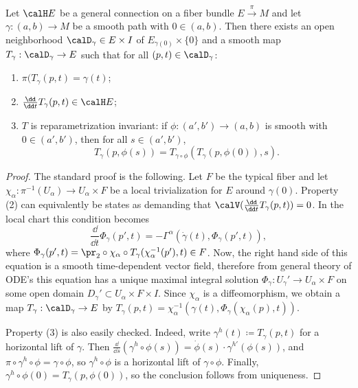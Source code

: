 \begin{thm}\label{prop parallel tra}
    Let $\calH E$ be a general connection on a fiber bundle $E\overset{\pi}{\to}M$ and let $\gamma:(a,b)\to M$ be a smooth path with $0\in(a,b)$. Then there exists an open neighborhood $\calD_\gamma\in E\times I$ of $E_{\gamma(0)}\times\{0\}$ and a smooth map $T_\gamma:\calD_\gamma\to E$ such that for all $(p,t)\in \calD_\gamma$: 
    \begin{enumerate}[label=(\arabic*)]
        \item $\pi(T_\gamma(p,t)=\gamma(t)$;
        \item $\frac{\dd}{\dd t}T_\gamma(p,t)\in \calH E$;
        \item $T$ is reparametrization invariant: if $\phi:(a',b')\to (a,b)$ is smooth with $0\in(a',b')$, then for all $s\in (a',b')$, 
        \[T_\gamma(p,\phi(s))=T_{\gamma\circ\phi}(T_\gamma(p,\phi(0)),s).\]
    \end{enumerate}
\end{thm}
\begin{proof}
    The standard proof is the following. Let $F$ be the typical fiber and let $\chi_\alpha:\pi^{-1}(U_\alpha)\to U_\alpha\times F$ be a local trivialization for $E$ around $\gamma(0)$. Property (2) can equivalently be states as demanding that $\calV(\frac{\dd}{\dd t}T_\gamma(p,t))=0$. In the local chart this condition becomes
    \[\frac{\dd}{\dd t}\Phi_\gamma(p',t)=-\varGamma^\alpha\left(\dot\gamma(t),\Phi_\gamma(p',t)\right),\]
    where $\Phi_\gamma(p',t)=\pr_2\circ \chi_\alpha\circ T_\gamma(\chi_\alpha^{-1}(p'),t)\in F$. Now, the right hand side of this equation is a smooth time-dependent vector field, therefore from general theory of ODE's this equation has a unique maximal integral solution $\Phi_\gamma:U_\gamma'\to U_\alpha\times F$ on some open domain $D_\gamma'\subset U_\alpha\times F\times I$. Since $\chi_\alpha$ is a diffeomorphism, we obtain a map $T_\gamma:\calD_\gamma\to E$ by $T_\gamma(p,t)=\chi_\alpha^{-1}(\gamma(t),\Phi_\gamma(\chi_\alpha(p),t))$.

    Property (3) is also easily checked. Indeed, write $\gamma^h(t)\coloneqq T_\gamma(p,t)$ for a horizontal lift of $\gamma$. Then $\frac{\dd}{\dd s}(\gamma^h\circ \phi(s))=\dot\phi(s)\cdot \gamma^{h\prime}(\phi(s))$, and $\pi\circ\gamma^h\circ\phi=\gamma\circ\phi$, so $\gamma^h\circ\phi$ is a horizontal lift of $\gamma\circ\phi$. Finally, $\gamma^h\circ\phi(0)=T_\gamma(p,\phi(0))$, so the conclusion follows from uniqueness.
\end{proof}


